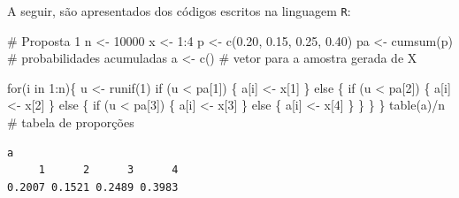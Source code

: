 \documentclass[
  letterpaper,
  DIV=11,
  numbers=noendperiod]{scrreprt}
\newenvironment{Shaded}{\begin{snugshade}}{\end{snugshade}}
\newcommand{\CommentTok}[1]{\textcolor[rgb]{0.37,0.37,0.37}{#1}}
\newcommand{\ControlFlowTok}[1]{\textcolor[rgb]{0.00,0.23,0.31}{#1}}
\newcommand{\DecValTok}[1]{\textcolor[rgb]{0.68,0.00,0.00}{#1}}
\newcommand{\FloatTok}[1]{\textcolor[rgb]{0.68,0.00,0.00}{#1}}
\newcommand{\FunctionTok}[1]{\textcolor[rgb]{0.28,0.35,0.67}{#1}}
\newcommand{\NormalTok}[1]{\textcolor[rgb]{0.00,0.23,0.31}{#1}}
\newcommand{\OtherTok}[1]{\textcolor[rgb]{0.00,0.23,0.31}{#1}}
\newcommand{\SpecialCharTok}[1]{\textcolor[rgb]{0.37,0.37,0.37}{#1}}
\begin{document}
A seguir, são apresentados dos códigos escritos na linguagem \texttt{R}:

\begin{Shaded}
\begin{Highlighting}[]
\CommentTok{\# Proposta 1}
\NormalTok{n }\OtherTok{\textless{}{-}} \DecValTok{10000}
\NormalTok{x }\OtherTok{\textless{}{-}} \DecValTok{1}\SpecialCharTok{:}\DecValTok{4} 
\NormalTok{p }\OtherTok{\textless{}{-}} \FunctionTok{c}\NormalTok{(}\FloatTok{0.20}\NormalTok{, }\FloatTok{0.15}\NormalTok{, }\FloatTok{0.25}\NormalTok{, }\FloatTok{0.40}\NormalTok{)}
\NormalTok{pa }\OtherTok{\textless{}{-}} \FunctionTok{cumsum}\NormalTok{(p) }\CommentTok{\# probabilidades acumuladas}
\NormalTok{a  }\OtherTok{\textless{}{-}} \FunctionTok{c}\NormalTok{() }\CommentTok{\# vetor para a amostra gerada de X}

\ControlFlowTok{for}\NormalTok{(i }\ControlFlowTok{in} \DecValTok{1}\SpecialCharTok{:}\NormalTok{n)\{}
\NormalTok{  u }\OtherTok{\textless{}{-}} \FunctionTok{runif}\NormalTok{(}\DecValTok{1}\NormalTok{)}
  \ControlFlowTok{if}\NormalTok{ (u }\SpecialCharTok{\textless{}}\NormalTok{ pa[}\DecValTok{1}\NormalTok{]) \{}
\NormalTok{    a[i] }\OtherTok{\textless{}{-}}\NormalTok{ x[}\DecValTok{1}\NormalTok{]}
\NormalTok{  \} }\ControlFlowTok{else}\NormalTok{ \{ }
      \ControlFlowTok{if}\NormalTok{ (u }\SpecialCharTok{\textless{}}\NormalTok{ pa[}\DecValTok{2}\NormalTok{]) \{}
\NormalTok{        a[i] }\OtherTok{\textless{}{-}}\NormalTok{ x[}\DecValTok{2}\NormalTok{]}
\NormalTok{      \} }\ControlFlowTok{else}\NormalTok{ \{ }\ControlFlowTok{if}\NormalTok{ (u }\SpecialCharTok{\textless{}}\NormalTok{ pa[}\DecValTok{3}\NormalTok{]) \{}
\NormalTok{        a[i] }\OtherTok{\textless{}{-}}\NormalTok{ x[}\DecValTok{3}\NormalTok{]}
\NormalTok{      \} }\ControlFlowTok{else}\NormalTok{ \{ }
\NormalTok{          a[i] }\OtherTok{\textless{}{-}}\NormalTok{ x[}\DecValTok{4}\NormalTok{]}
\NormalTok{          \}}
\NormalTok{      \}}
\NormalTok{    \}}
\NormalTok{\}}
\FunctionTok{table}\NormalTok{(a)}\SpecialCharTok{/}\NormalTok{n }\CommentTok{\# tabela de proporções}
\end{Highlighting}
\end{Shaded}

\begin{verbatim}
a
     1      2      3      4 
0.2007 0.1521 0.2489 0.3983 
\end{verbatim}
\end{document}
